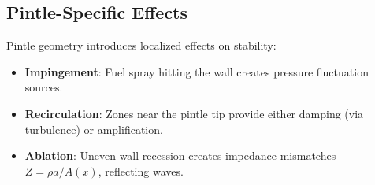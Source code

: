 \subsection{Pintle-Specific Effects}
Pintle geometry introduces localized effects on stability:
\begin{itemize}
    \item \textbf{Impingement}: Fuel spray hitting the wall creates pressure fluctuation sources.
    \item \textbf{Recirculation}: Zones near the pintle tip provide either damping (via turbulence) or amplification.
    \item \textbf{Ablation}: Uneven wall recession creates impedance mismatches $Z = \rho a / A(x)$, reflecting waves.
\end{itemize}
